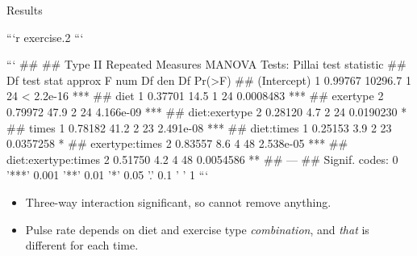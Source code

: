 \documentclass[ignorenonframetext,]{beamer}
\begin{document}
\begin{frame}{Results}
\protect\hypertarget{results}{}

\begin{scriptsize}

```r
exercise.2
```

```
## 
## Type II Repeated Measures MANOVA Tests: Pillai test statistic
##                     Df test stat approx F num Df den Df    Pr(>F)    
## (Intercept)          1   0.99767  10296.7      1     24 < 2.2e-16 ***
## diet                 1   0.37701     14.5      1     24 0.0008483 ***
## exertype             2   0.79972     47.9      2     24 4.166e-09 ***
## diet:exertype        2   0.28120      4.7      2     24 0.0190230 *  
## times                1   0.78182     41.2      2     23 2.491e-08 ***
## diet:times           1   0.25153      3.9      2     23 0.0357258 *  
## exertype:times       2   0.83557      8.6      4     48 2.538e-05 ***
## diet:exertype:times  2   0.51750      4.2      4     48 0.0054586 ** 
## ---
## Signif. codes:  0 '***' 0.001 '**' 0.01 '*' 0.05 '.' 0.1 ' ' 1
```

       
\end{scriptsize}

\begin{itemize}
\item
  Three-way interaction significant, so cannot remove anything.
\item
  Pulse rate depends on diet and exercise type \emph{combination}, and
  \emph{that} is different for each time.
\end{itemize}

\end{frame}
\end{document}
